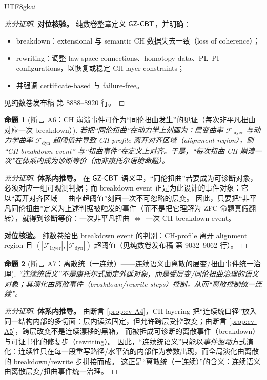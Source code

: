 \documentclass[12pt]{article}
\newtheorem{proposition}{命题}[section]
\begin{document}
\begin{CJK*}{UTF8}{gkai}
\begin{proof}[充分证明]
\textbf{对位核验。}
纯数卷整章定义 $\mathsf{GZ\text{-}CBT}$，并明确：
\begin{itemize}
  \item breakdown：extensional 与 semantic CH 数据失去一致（loss of coherence）；
  \item rewriting：调整 law-space connections、homotopy data、PL--PI configurations，以恢复或稳定 CH-layer constraints；
  \item 并强调 certificate-based 与 failure-free。
\end{itemize}
见纯数卷发布稿\cite{GaoZheng2025GFramework} 第 8888--8920 行。
\end{proof}

\begin{proposition}[断言 A6：CH 崩溃事件可作为“同伦扭曲发生”的见证（每次非平凡扭曲对应一次 breakdown）]\label{prop:cv-A6}
若把“同伦扭曲”在动力学上刻画为：层变曲率 $\mathcal F_{\mathrm{layer}}$ 与动力学曲率 $\mathcal F_{\mathrm{dyn}}$ 超阈值并导致 CH-profile
  离开对齐区域（alignment region），则 “CH breakdown event” 与“扭曲事件”在定义上对齐。于是，“每次扭曲 CH 崩溃一次”在体系内成为诊断等价（而非康托尔语境命题）。
\end{proposition}

\begin{proof}[充分证明]
\textbf{体系内推导。}
在 $\mathsf{GZ\text{-}CBT}$ 语义里，“同伦扭曲”若要成为可诊断对象，必须对应一组可观测判据；而 breakdown event 正是为此设计的事件对象：它以“离开对齐区域 + 曲率超阈值”刻画一次不可忽略的层变。
因此，只要把“非平凡同伦扭曲”定义为上述判据被触发的事件（而不是把它理解为 ZFC 命题真假翻转），就得到诊断等价：一次非平凡扭曲 $\Longleftrightarrow$ 一次 CH breakdown event。

\textbf{对位核验。}
纯数卷给出 breakdown event 的判别：CH-profile 离开 alignment region 且 $(|\mathcal F_{\mathrm{layer}}|,|\mathcal F_{\mathrm{dyn}}|)$
  超阈值（见纯数卷发布稿\cite{GaoZheng2025GFramework} 第 9032--9062 行）。
\end{proof}

\begin{proposition}[断言 A7：离散统（一连续）——连续语义由离散的层变/扭曲事件统一治理]\label{prop:cv-A7}
“连续统语义”不是康托尔式固定外延对象，而是受层变/同伦扭曲治理的语义对象；其演化由离散事件（breakdown/rewrite steps）控制，从而“离散控制统一连续”。
\end{proposition}

\begin{proof}[充分证明]
\textbf{体系内推导。}
由断言 \ref{prop:cv-A4}，CH-layering 把“连续统口径”放入同一结构内部的多切面：层内读法固定，但允许跨层受控改变；由断言 \ref{prop:cv-A5}，跨层改变不是连续漂移的黑箱，
  而被拆成可诊断的离散事件（breakdown）与可证书化的修复步（rewriting）。
因此，“连续统语义”只能以\emph{事件驱动}方式演化：连续性只在每一段重写路径/水平流的内部作为参数出现，而全局演化由离散的 breakdown/rewrite 步拼接而成。
这正是“离散统（一连续）”的含义：连续语义由离散层变/扭曲事件统一治理。


\end{proof}
\end{CJK*}
\end{document}
